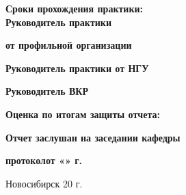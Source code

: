 \documentclass{article}
\begin{document}
\begin{titlepage}
	\noindent
	\hrulefill

	\noindent
	\textbf{Сроки прохождения практики:} \underline{\hspace{5cm}}\\

	\noindent
	\textbf{Руководитель практики}

	\noindent
	\textbf{от профильной организации} \quad\quad{}\qquad{}

	\noindent
	\textbf{Руководитель практики от НГУ}\;\; \qquad{}

	\noindent
	\textbf{Руководитель ВКР}\qquad\qquad\qquad\; \qquad{}

	\noindent
	\textbf{Оценка по итогам защиты отчета:} 

	\noindent
	\textbf{Отчет заслушан на заседании кафедры}\;

	\noindent
	\textbf{протокол\quad\longunder{1.5cm}\quad от \quad «\longunder{0.5cm}»
	\quad\longunder{4cm}\longunder{0.5cm} г.} \leavevmode

	\vspace{3cm}

	{\centering Новосибирск 20\longunder{0.5cm} г. \\}
\end{titlepage}
\end{document}
